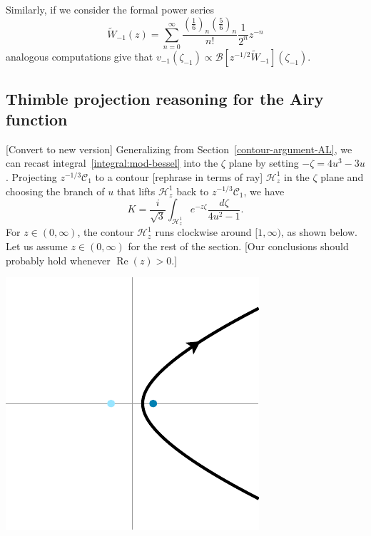 \documentclass{article}
\newcommand{\borel}{\mathcal{B}}
\theoremstyle{definition}
\theoremstyle{plain}
\newenvironment{todo}{\color{Coral}}{\color{black}}
\newenvironment{old}{\color{RoyalBlue}}{\color{black}}
\begin{document}
\begin{old}
Similarly, if we consider the formal power series
\begin{equation}
\tilde{W}_{-1}(z)=\sum_{n=0}^{\infty}\frac{\left(\frac{1}{6}\right)_n\left(\frac{5}{6}\right)_n}{n!}\frac{1}{2^n}z^{-n}
\end{equation}
analogous computations give that $v_{-1}(\zeta_{-1})\propto\borel\left[z^{-1/2}\tilde{W}_{-1}\right](\zeta_{-1})$.
\subsection{Thimble projection reasoning for the Airy function}%
\begin{todo}[Convert to new version]\end{todo} Generalizing from Section~\ref{contour-argument-AL}, we can recast integral~\eqref{integral:mod-bessel} into the $\zeta$ plane by setting $-\zeta = 4u^3 - 3u$. Projecting $z^{-1/3} \mathcal{C}_1$ to a contour \begin{todo}[rephrase in terms of ray]\end{todo} $\mathcal{H}^1_z$ in the $\zeta$ plane and choosing the branch of $u$ that lifts $\mathcal{H}^1_z$ back to $z^{-1/3} \mathcal{C}_1$, we have
\begin{equation}\label{integral:mod-bessel-zeta}
K = \frac{i}{\sqrt{3}} \int_{\mathcal{H}^1_z} e^{-z\zeta}\frac{d\zeta}{4u^2 - 1}.
\end{equation}
For $z \in (0, \infty)$, the contour $\mathcal{H}^1_z$ runs clockwise around $[1, \infty)$, as shown below. Let us assume $z \in (0, \infty)$ for the rest of the section. \begin{todo}[Our conclusions should probably hold whenever $\operatorname{Re}(z) > 0$.]\end{todo}
\begin{center}
\includegraphics{figures/zeta_contour_3.pdf} \\[1em]

\end{center}
\end{old}
\end{document}
